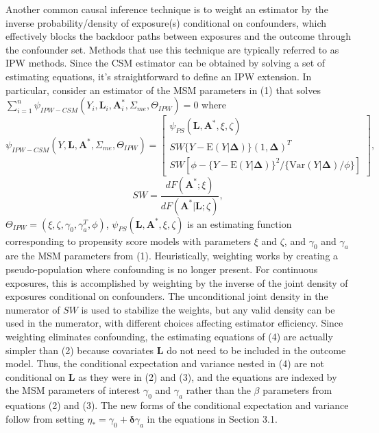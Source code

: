 \documentclass[useAMS,usenatbib,referee]{biom}
\begin{document}
Another common causal inference technique is to weight an estimator by the inverse probability/density of exposure(s) conditional on confounders, which effectively blocks the backdoor paths between exposures and the outcome through the confounder set. Methods that use this technique are typically referred to as IPW methods. Since the CSM estimator can be obtained by solving a set of estimating equations, it's straightforward to define an IPW extension. In particular, consider an estimator of the MSM parameters in (1) that solves $\sum_{i=1}^{n} \psi_{IPW-CSM}(Y_{i}, \bm{L}_{i}, \bm{A}^{*}_{i}, \Sigma_{me}, \Theta_{IPW}) = 0$ where
\begin{equation}
    \psi_{IPW-CSM}(Y, \bm{L}, \bm{A}^{*}, \Sigma_{me}, \Theta_{IPW}) =
    \begin{bmatrix}
        \psi_{PS}(\bm{L}, \bm{A}^{*}, \xi, \zeta) \\
       SW \{ Y - \text{E}(Y | \bm{\Delta}) \} (1, \bm{\Delta})^{T} \\
       SW \left [ \phi - \{ Y - \text{E}(Y | \bm{\Delta})\}^{2} / \{ \text{Var}(Y | \bm{\Delta}) / \phi \} \right ]
    \end{bmatrix},
\end{equation}
\begin{equation}
SW = \frac{dF(\bm{A}^{*}; \xi)}{dF(\bm{A}^{*} | \bm{L}; \zeta)},
\end{equation}
$\Theta_{IPW} = (\xi, \zeta, \gamma_{0}, \gamma^{T}_{a}, \phi)$, $\psi_{PS}(\bm{L}, \bm{A}^{*}, \xi, \zeta)$ is an estimating function corresponding to propensity score models with parameters $\xi$ and $\zeta$, and $\gamma_{0}$ and $\gamma_{a}$ are the MSM parameters from (1). Heuristically, weighting works by creating a pseudo-population where confounding is no longer present. For continuous exposures, this is accomplished by weighting by the inverse of the joint density of exposures conditional on confounders. The unconditional joint density in the numerator of $SW$ is used to stabilize the weights, but any valid density can be used in the numerator, with different choices affecting estimator efficiency. Since weighting eliminates confounding, the estimating equations of (4) are actually simpler than (2) because covariates $\bm{L}$ do not need to be included in the outcome model. Thus, the conditional expectation and variance nested in (4) are not conditional on $\bm{L}$ as they were in (2) and (3), and the equations are indexed by the MSM parameters of interest $\gamma_{0}$ and $\gamma_{a}$ rather than the $\beta$ parameters from equations (2) and (3). The new forms of the conditional expectation and variance follow from setting $\eta_{*} = \gamma_{0} + \bm{\delta}\gamma_{a}$ in the equations in Section 3.1.
\end{document}
